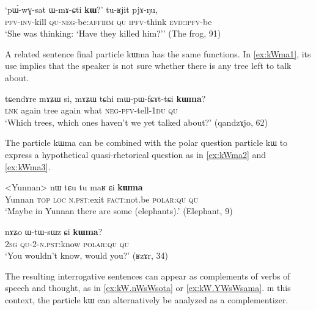 \documentclass[oldfontcommands,oneside,a4paper,11pt]{article}
\newcommand{\ipa}[1]{{\phon #1}} %
\begin{document}
  \begin{exe} 
 \ex \label{ex:pWwGsat}
\gll 
`\ipa{pɯ́-wɣ-sat} 	\ipa{ɯ-mɤ-ɕti} 	\ipa{\textbf{kɯ}?}' 	\ipa{tu-ʁjit} 	\ipa{pjɤ-ŋu,} \\
\textsc{pfv-inv}-kill \textsc{qu-neg}-be:\textsc{affirm} \textsc{qu} \textsc{ipfv}-think \textsc{evd:ipfv}-be \\
\glt `She was thinking: `Have they killed him?'' (The frog, 91)
 \end{exe}  
 
 A related sentence final particle \ipa{kɯma} has the same functions. In  \ref{ex:kWma1}, its use implies that   the speaker is not sure whether there is any tree left to talk about.
   \begin{exe} 
 \ex \label{ex:kWma1}
\gll 
 \ipa{tɕendɤre} 	\ipa{mɤʑɯ} 	\ipa{si,} 	\ipa{mɤʑɯ} 	\ipa{tɕhi} 	\ipa{mɯ-pɯ-fɕɤt-tɕi} 	\ipa{\textbf{kɯma}?} \\
\textsc{lnk} again tree again what \textsc{neg-pfv}-tell-\textsc{1du} \textsc{qu} \\
\glt `Which trees, which ones haven't we yet talked about?'  (qandzɤjo, 62)
  \end{exe} 
  
  The particle \ipa{kɯma} can be combined with the polar question particle \ipa{kɯ} to express a hypothetical quasi-rhetorical question as in \ref{ex:kWma2} and \ref{ex:kWma3}.
     \begin{exe} 
 \ex \label{ex:kWma2}
\gll 
 <Yunnan> \ipa{nɯ} 	\ipa{tɕu} 	\ipa{tu} 	\ipa{maʁ} 	\ipa{ɕi} 	\ipa{\textbf{kɯma}} \\
 Yunnan \textsc{top} \textsc{loc} \textsc{n.pst:}exit \textsc{fact}:not.be \textsc{polar:qu} \textsc{qu} \\
\glt  `Maybe in Yunnan there are some (elephants).' (Elephant, 9)
   \end{exe}
   
        \begin{exe} 
 \ex \label{ex:kWma3}
\gll 
 \ipa{nɤʑo} 	\ipa{ɯ-tɯ-sɯz} 	\ipa{ɕi} 	\ipa{\textbf{kɯma}?}  \\
 \textsc{2sg} \textsc{qu-2-n.pst}:know \textsc{polar:qu} \textsc{qu} \\
\glt `You wouldn't know, would you?' (ʁzɤr, 34)
    \end{exe}
    
    
    The resulting interrogative sentences can appear as complements of verbs of speech and thought, as in \ref{ex:kW.nWsWsota} or \ref{ex:kW.YWsWsama}. ɪn this context, the particle \ipa{kɯ} can alternatively be analyzed as a complementizer.
    
\end{document}
